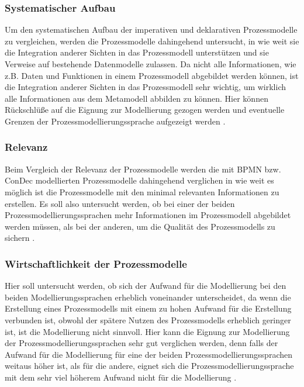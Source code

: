 \subsubsection{Systematischer Aufbau}
Um den systematischen Aufbau der imperativen und deklarativen Prozessmodelle zu vergleichen, werden die Prozessmodelle dahingehend untersucht, in wie weit sie die Integration anderer Sichten in das Prozessmodell unterstützen und sie Verweise auf bestehende Datenmodelle zulassen. Da nicht alle Informationen, wie z.B. Daten und Funktionen in einem Prozessmodell abgebildet werden können, ist die Integration anderer Sichten in das Prozessmodell sehr wichtig, um wirklich alle Informationen aus dem Metamodell abbilden zu können. Hier können Rückschlüße auf die Eignung zur Modellierung gezogen werden und eventuelle Grenzen der Prozessmodellierungssprache aufgezeigt werden \cite{journals95, freund2007, becker2012prozessmanagement,koch2011}.

\subsubsection{Relevanz}
Beim Vergleich der Relevanz der Prozessmodelle werden die mit BPMN bzw. ConDec modellierten Prozessmodelle dahingehend verglichen in wie weit es möglich ist die Prozessmodelle mit den minimal relevanten Informationen zu erstellen. Es soll also untersucht werden, ob bei einer der beiden Prozessmodellierungssprachen mehr Informationen im Prozessmodell abgebildet werden müssen, als bei der anderen, um die Qualität des Prozessmodells zu sichern \cite{journals95, freund2007,reinshagen2009}. 

\subsubsection{Wirtschaftlichkeit der Prozessmodelle}
Hier soll untersucht werden, ob sich der Aufwand für die Modellierung bei den beiden Modellierungssprachen erheblich voneinander unterscheidet, da wenn die Erstellung eines Prozessmodells mit einem zu hohen Aufwand für die Erstellung verbunden ist, obwohl der spätere Nutzen des Prozessmodells erheblich geringer ist, ist die Modellierung nicht sinnvoll. Hier kann die Eignung zur Modellierung der Prozessmodellierungssprachen sehr gut verglichen werden, denn falls der Aufwand für die Modellierung für eine der beiden Prozessmodellierungssprachen weitaus höher ist, als für die andere, eignet sich die Prozessmodellierungssprache mit dem sehr viel höherem Aufwand nicht für die Modellierung \cite{freund2007, journals95, leimeister2012}.

